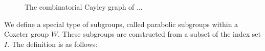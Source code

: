 \begin{figure}[ht]
    \caption{The combinatorial Cayley graph of ...}
    \label{fig:cayleygraphs}
    
    \centering
\end{figure}

We define a special type of subgroups, called parabolic subgroups within a Coxeter group \(W\).
These subgroups are constructed from a subset of the index set \(I\).
The definition is as follows:

